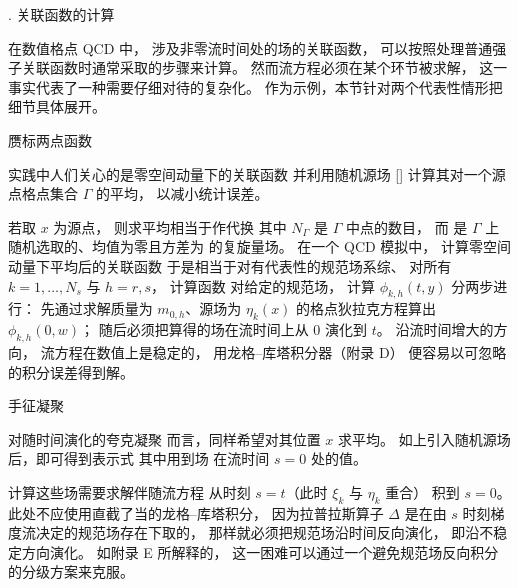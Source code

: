 
. 关联函数的计算

在数值格点 QCD 中，
涉及非零流时间处的场的关联函数，
可以按照处理普通强子关联函数时通常采取的步骤来计算。
然而流方程必须在某个环节被求解，
这一事实代表了一种需要仔细对待的复杂化。
作为示例，本节针对两个代表性情形把细节具体展开。


 赝标两点函数

实践中人们关心的是零空间动量下的关联函数
并利用随机源场 [\cite{MichaelPeisa}]
计算其对一个源点格点集合 $\Gamma$ 的平均，
以减小统计误差。

若取 $x$ 为源点，
则求平均相当于作代换
其中 $N_{\Gamma}$ 是 $\Gamma$ 中点的数目，
而
是 $\Gamma$ 上随机选取的、均值为零且方差为
的复旋量场。
在一个 QCD 模拟中，
计算零空间动量下平均后的关联函数
于是相当于对有代表性的规范场系综、
对所有 $k=1,\ldots,N_s$ 与 $h=r,s$，
计算函数
对给定的规范场，
计算 $\phi_{k,h}(t,y)$ 分两步进行：
先通过求解质量为 $m_{0,h}$、源场为 $\eta_k(x)$
的格点狄拉克方程算出 $\phi_{k,h}(0,w)$；
随后必须把算得的场在流时间上从 0 演化到 $t$。
沿流时间增大的方向，
流方程在数值上是稳定的，
用龙格--库塔积分器（附录 D）
便容易以可忽略的积分误差得到解。


 手征凝聚

对随时间演化的夸克凝聚
而言，同样希望对其位置 $x$ 求平均。
如上引入随机源场后，即可得到表示式
其中用到场
在流时间 $s=0$ 处的值。

计算这些场需要求解伴随流方程
从时刻 $s=t$（此时 $\xi_k$ 与 $\eta_k$ 重合）
积到 $s=0$。
此处不应使用直截了当的龙格--库塔积分，
因为拉普拉斯算子 $\Delta$ 是在由 $s$ 时刻梯度流决定的规范场存在下取的，
那样就必须把规范场沿时间反向演化，
即沿不稳定方向演化。
如附录 E 所解释的，
这一困难可以通过一个避免规范场反向积分的分级方案来克服。
